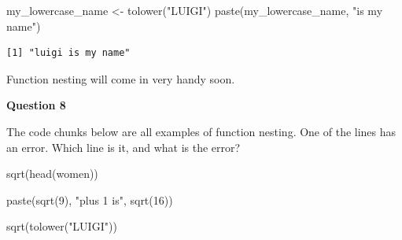 \documentclass[
  letterpaper,
  DIV=11,
  numbers=noendperiod]{scrreprt}
\newenvironment{Shaded}{\begin{snugshade}}{\end{snugshade}}
\newcommand{\DecValTok}[1]{\textcolor[rgb]{0.68,0.00,0.00}{#1}}
\newcommand{\FunctionTok}[1]{\textcolor[rgb]{0.28,0.35,0.67}{#1}}
\newcommand{\NormalTok}[1]{\textcolor[rgb]{0.00,0.23,0.31}{#1}}
\newcommand{\OtherTok}[1]{\textcolor[rgb]{0.00,0.23,0.31}{#1}}
\newcommand{\StringTok}[1]{\textcolor[rgb]{0.13,0.47,0.30}{#1}}
\begin{document}
\begin{Shaded}
\begin{Highlighting}[]
\NormalTok{my\_lowercase\_name }\OtherTok{\textless{}{-}} \FunctionTok{tolower}\NormalTok{(}\StringTok{"LUIGI"}\NormalTok{)}
\FunctionTok{paste}\NormalTok{(my\_lowercase\_name, }\StringTok{"is my name"}\NormalTok{)}
\end{Highlighting}
\end{Shaded}

\begin{verbatim}
[1] "luigi is my name"
\end{verbatim}

Function nesting will come in very handy soon.

\begin{tcolorbox}[enhanced jigsaw, titlerule=0mm, colback=white, left=2mm, breakable, opacitybacktitle=0.6, colbacktitle=quarto-callout-tip-color!10!white, colframe=quarto-callout-tip-color-frame, bottomtitle=1mm, opacityback=0, coltitle=black, arc=.35mm, toptitle=1mm, title=\textcolor{quarto-callout-tip-color}{\faLightbulb}\hspace{0.5em}{Practice}, leftrule=.75mm, toprule=.15mm, bottomrule=.15mm, rightrule=.15mm]

\textbf{Question 8}

The code chunks below are all examples of function nesting. One of the
lines has an error. Which line is it, and what is the error?

\begin{Shaded}
\begin{Highlighting}[]
\FunctionTok{sqrt}\NormalTok{(}\FunctionTok{head}\NormalTok{(women))}
\end{Highlighting}
\end{Shaded}

\begin{Shaded}
\begin{Highlighting}[]
\FunctionTok{paste}\NormalTok{(}\FunctionTok{sqrt}\NormalTok{(}\DecValTok{9}\NormalTok{), }\StringTok{"plus 1 is"}\NormalTok{, }\FunctionTok{sqrt}\NormalTok{(}\DecValTok{16}\NormalTok{))}
\end{Highlighting}
\end{Shaded}

\begin{Shaded}
\begin{Highlighting}[]
\FunctionTok{sqrt}\NormalTok{(}\FunctionTok{tolower}\NormalTok{(}\StringTok{"LUIGI"}\NormalTok{))}
\end{Highlighting}
\end{Shaded}

\end{tcolorbox}
\end{document}
